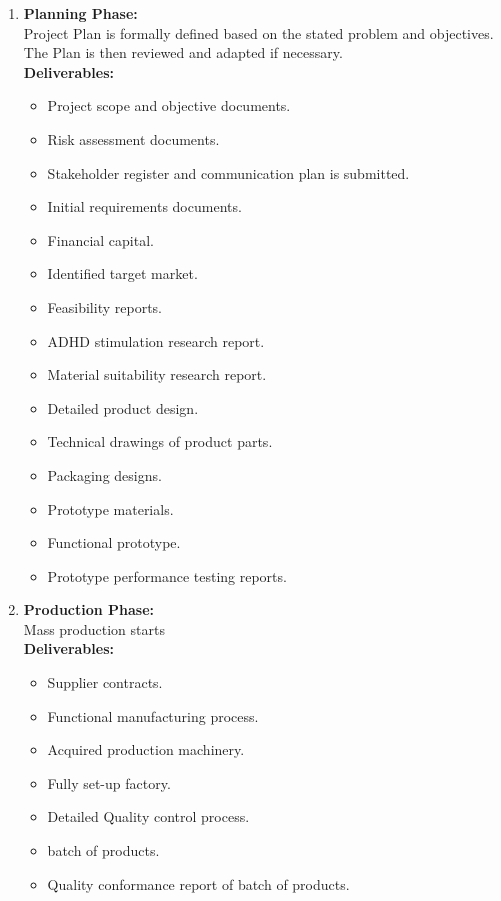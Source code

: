 \documentclass{article}
\begin{document}
  \begin{enumerate}
    \item \textbf{Planning Phase:} \\
      Project Plan is formally defined based on the stated problem and
      objectives. The Plan is then reviewed and adapted if necessary. \\
      \textbf{Deliverables:}
      \begin{itemize}
        \item Project scope and objective documents.
        \item Risk assessment documents.
        \item Stakeholder register and communication plan is submitted.
        \item Initial requirements documents.
        \item Financial capital. 
        \item Identified target market.
        \item Feasibility reports. 
        \item ADHD stimulation research report. 
        \item Material suitability research report. 
        \item Detailed product design.
        \item Technical drawings of product parts.
        \item Packaging designs.
        \item Prototype materials. 
        \item Functional prototype. 
        \item Prototype performance testing reports. 
      \end{itemize}
    \item \textbf{Production Phase:} \\
      Mass production starts \\
      \textbf{Deliverables:}
      \begin{itemize}
        \item Supplier contracts. 
        \item Functional manufacturing process. 
        \item Acquired production machinery. 
        \item Fully set-up factory. 
        \item Detailed Quality control process. 
        \item batch of products. 
        \item Quality conformance report of batch of products. 

\end{itemize}
\end{enumerate}
\end{document}
